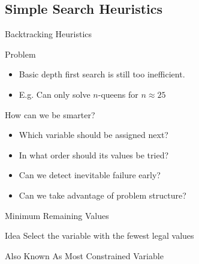 \documentclass[12pt]{beamer}
\begin{document}
\subsection{Simple Search Heuristics}
\begin{frame}{Backtracking Heuristics}
	\begin{block}{Problem}
		\begin{itemize}
			\item Basic depth first search is still too inefficient.
			\item E.g. Can only solve $n$-queens for $n \approx 25$
		\end{itemize}
	\end{block}
	\begin{block}{How can we be smarter?}
		\begin{itemize}
			\pause
			\item Which variable should be assigned next?
			\pause
			\item In what order should its values be tried?
			\pause
			\item Can we detect inevitable failure early?
			\pause
			\item Can we take advantage of problem structure?
		\end{itemize}
	\end{block}
\end{frame}
\begin{frame}{Minimum Remaining Values}
	\begin{block}{Idea}
		Select the variable with the fewest legal values \\
	\end{block}
	\pause
	\begin{center}
	\end{center}
	\pause
	\begin{block}{Also Known As}
		Most Constrained Variable
	\end{block}
\end{frame}
\end{document}
